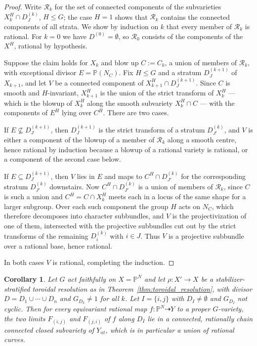 \documentclass[11pt]{amsart}
\theoremstyle{plain}
\newtheorem{corollary}[theorem]{Corollary}
\theoremstyle{definition}
\theoremstyle{remark}
\numberwithin{equation}{section}
\begin{document}
\begin{proof}
Write $\mathcal{R}_k$ for the set of connected components of the
subvarieties $X_k^H \cap D^{(k)}_J$, $H \leq G$; the case $H = 1$ shows
that $\mathcal{R}_k$ contains the connected components of all strata.  We
show by induction on $k$ that every member of $\mathcal{R}_k$ is rational.
For $k = 0$ we have $D^{(0)} = \emptyset$, so $\mathcal{R}_0$ consists of
the components of the $X^H$, rational by hypothesis.

Suppose the claim holds for $X_k$ and blow up $C := C_k$, a union of
members of $\mathcal{R}_k$, with exceptional divisor $E = \mathbb{P}(N_C)$.
Fix $H \leq G$ and a stratum $D^{(k+1)}_J$ of $X_{k+1}$, and let $V$ be a
connected component of $X_{k+1}^H \cap D_J^{(k+1)}$.  Since $C$ is smooth
and $H$-invariant, $X_{k+1}^H$ is the union of the strict transform of
$X_k^H$ --- which is the blowup of $X_k^H$ along the smooth subvariety
$X_k^H \cap C$ --- with the components of $E^H$ lying over $C^H$.  There
are two cases.

If $E \not\subseteq D^{(k+1)}_J$, then $D^{(k+1)}_J$ is the strict
transform of a stratum $D^{(k)}_{J'}$, and $V$ is either a component of the
blowup of a member of $\mathcal{R}_k$ along a smooth centre, hence rational
by induction because a blowup of a rational variety is rational, or a
component of the second case below.

If $E \subseteq D^{(k+1)}_J$, then $V$ lies in $E$ and maps to
$C^H \cap D^{(k)}_{J'}$ for the corresponding stratum $D^{(k)}_{J'}$
downstairs.  Now $C^H \cap D^{(k)}_{J'}$ is a union of members of
$\mathcal{R}_k$, since $C$ is such a union and $C^H = C \cap X_k^H$ meets
each in a locus of the same shape for a larger subgroup.  Over each such
component the group $H$ acts on $N_C$, which therefore decomposes into
character subbundles, and $V$ is the projectivization of one of them,
intersected with the projective subbundles cut out by the strict transforms
of the remaining $D^{(k)}_i$ with $i \in J$.  Thus $V$ is a projective
subbundle over a rational base, hence rational.

In both cases $V$ is rational, completing the induction.
\end{proof}

\begin{corollary} \label{cor:pn_resolved}
Let $G$ act faithfully on $X = \mathbb{P}^N$ and let $\rho : X' \to X$ be a
stabilizer-stratified toroidal resolution as in
Theorem~\ref{thm:toroidal_resolution}, with divisor $D = D_1 \cup \cdots
\cup D_n$ and $G_{D_k} \neq 1$ for all $k$.  Let $I = \{i,j\}$ with
$D_I \neq \emptyset$ and $G_{D_I}$ not cyclic.  Then for every equivariant
rational map $f : \mathbb{P}^N \dasharrow Y$ to a proper $G$-variety, the
two limits $F_{(i,j)}$ and $F_{(j,i)}$ of $f$ along $D_I$ lie in a
connected, rationally chain connected closed subvariety of $Y_{nt}$, which
is in particular a union of rational curves.
\end{corollary}
\end{document}
